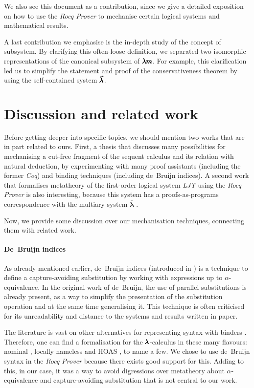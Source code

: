We also see this document as a contribution, since we give a detailed exposition on how to use the \textit{Rocq Prover} to mechanise certain logical systems and mathematical results.

A last contribution we emphasise is the in-depth study of the concept of subsystem.
By clarifying this often-loose definition, we separated two isomorphic representations of the canonical subsystem of $\pmb{\lambda m}$.
For example, this clarification led us to simplify the statement and proof of the conservativeness theorem by using the self-contained system $\pmb{\vec \lambda}$.

\section{Discussion and related work}

Before getting deeper into specific topics, we should mention two works that are in part related to ours.
First, a thesis \cite{AndrewAdams} that discusses many possibilities for mechanising a cut-free fragment of the sequent calculus and its relation with natural deduction, by experimenting with many proof assistants (including the former \textit{Coq}) and binding techniques (including de~Bruijn indices).
A second work \cite{Herbelin2017} that formalises metatheory of the first-order logical system \textit{LJT} using the \textit{Rocq Prover} is also interesting, because this system has a proofs-as-programs correspondence with the multiary system $\overline{\pmb \lambda}$ \cite{Herbelin1994}. 

Now, we provide some discussion over our mechanisation techniques, connecting them with related work.

\paragraph{De~Bruijn indices}
As already mentioned earlier, de~Bruijn indices (introduced in \cite{deBruijn}) is a technique to define a capture-avoiding substitution by working with expressions up to $\alpha$-equivalence.
In the original work of de~Bruijn, the use of parallel substitutions is already present, as a way to simplify the presentation of the substitution operation and at the same time generalising it.
This technique is often criticised for its unreadability and distance to the systems and results written in paper.

The literature is vast on other alternatives for representing syntax with binders \cite[Section~2.3]{POPLmark}.
Therefore, one can find a formalisation for the $\pmb{\lambda}$-calculus in these many flavours: nominal \cite{Vestergaard2001}, locally nameless \cite{McKinna1999} and HOAS \cite{Despeyroux1995}, to name a few.
We chose to use de~Bruijn syntax in the \textit{Rocq Prover} because there exists good support for this.
Adding to this, in our case, it was a way to avoid digressions over metatheory about $\alpha$-equivalence and capture-avoiding substitution that is not central to our work.

